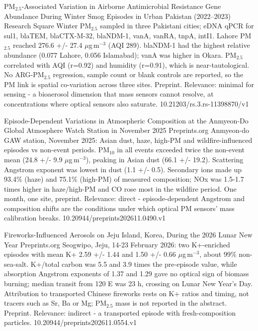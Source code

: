 \documentclass[10pt]{article}
\begin{document}
{PM$_{2.5}$-Associated Variation in Airborne Antimicrobial Resistance Gene Abundance During Winter Smog Episodes in Urban Pakistan (2022–2023)}
{Research Square}
{Winter PM$_{2.5}$ sampled in three Pakistani cities; eDNA qPCR for sul1, blaTEM, blaCTX-M-32, blaNDM-1, vanA, vanRA, tnpA, intI1. Lahore PM$_{2.5}$ reached 276.6 +/- 27.4 $\mu$g\,m$^{-3}$ (AQI 289). blaNDM-1 had the highest relative abundance (0.077 Lahore, 0.056 Islamabad); vanA was higher in Okara. PM$_{2.5}$ correlated with AQI (r=0.92) and humidity (r=0.91), which is near-tautological. No ARG-PM$_{2.5}$ regression, sample count or blank controls are reported, so the PM link is spatial co-variation across three sites. Preprint. Relevance: minimal for sensing - a bioaerosol dimension that mass sensors cannot resolve, at concentrations where optical sensors also saturate.}
{10.21203/rs.3.rs-11398870/v1}

{Episode-Dependent Variations in Atmospheric Composition at the Anmyeon-Do Global Atmosphere Watch Station in November 2025}
{Preprints.org}
{Anmyeon-do GAW station, November 2025: Asian dust, haze, high-PM and wildfire-influenced episodes vs non-event periods. PM$_{10}$ in all events exceeded twice the non-event mean (24.8 +/- 9.9 $\mu$g\,m$^{-3}$), peaking in Asian dust (66.1 +/- 19.2). Scattering Angstrom exponent was lowest in dust (1.1 +/- 0.5). Secondary ions made up 93.4\% (haze) and 75.1\% (high-PM) of measured composition; NOx was 1.5-1.7 times higher in haze/high-PM and CO rose most in the wildfire period. One month, one site, preprint. Relevance: direct - episode-dependent Angstrom and composition shifts are the conditions under which optical PM sensors' mass calibration breaks.}
{10.20944/preprints202611.0490.v1}

{Fireworks-Influenced Aerosols on Jeju Island, Korea, During the 2026 Lunar New Year}
{Preprints.org}
{Seogwipo, Jeju, 14-23 February 2026: two K+-enriched episodes with mean K+ 2.59 +/- 1.44 and 1.50 +/- 0.66 $\mu$g\,m$^{-3}$, about 99\% non-sea-salt. K+/total carbon was 5.5 and 3.9 times the pre-episode value, while absorption Angstrom exponents of 1.37 and 1.29 gave no optical sign of biomass burning; median transit from 120 E was 23 h, crossing on Lunar New Year's Day. Attribution to transported Chinese fireworks rests on K+ ratios and timing, not tracers such as Sr, Ba or Mg; PM$_{2.5}$ mass is not reported in the abstract. Preprint. Relevance: indirect - a transported episode with fresh-composition particles.}
{10.20944/preprints202611.0554.v1}
\end{document}
